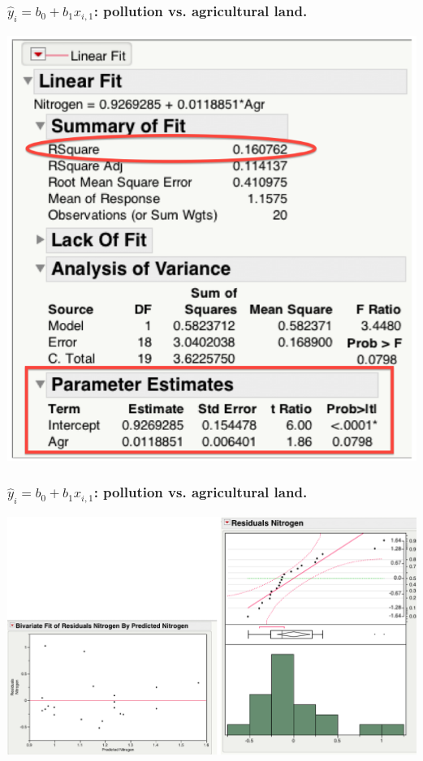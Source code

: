 \documentclass[handout]{beamer}
\providecommand{\wh}[1]{\widehat{#1}}
\numberwithin{equation}{section}
\begin{document}
\begin{frame}
\frametitle{$\wh{y}_i = b_0 + b_1 x_{i, 1} $: pollution vs. agricultural land.}
\begin{center}
 \includegraphics{../../fig/riversmodel1output.png}
\end{center}
\end{frame}


\begin{frame}
\frametitle{$\wh{y}_i = b_0 + b_1 x_{i, 1} $: pollution vs. agricultural land.}
\begin{center}
 \includegraphics{../../fig/riversmodel1diagnostics.png}
\end{center}
\end{frame}
\end{document}
